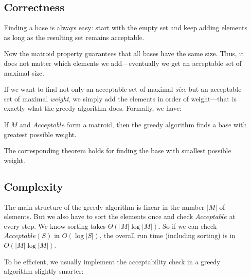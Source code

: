 \subsection{Correctness}

Finding a base is always easy: start with the empty set and keep adding elements as long as the resulting set remains acceptable.

Now the matroid property guarantees that all bases have the same size.
Thus, it does not matter which elements we add---eventually we get an acceptable set of maximal size.

If we want to find not only an acceptable set of maximal \emph{size} but an acceptable set of maximal \emph{weight}, we simply add the elements in order of weight---that is exactly what the greedy algorithm does.
Formally, we have:

\begin{theorem}
If $M$ and $Acceptable$ form a matroid, then the greedy algorithm finds a base with greatest possible weight.
\end{theorem}

The corresponding theorem holds for finding the base with smallest possible weight.

\subsection{Complexity}

The main structure of the greedy algorithm is linear in the number $|M|$ of elements.
But we also have to sort the elements once and check $Acceptable$ at every step.
We know sorting takes $\Theta(|M|\log |M|)$.
So if we can check $Acceptable(S)$ in $O(\log|S|)$, the overall run time (including sorting) is in $O(|M|\log|M|)$.

To be efficient, we usually implement the acceptability check in a greedy algorithm slightly smarter:
\begin{acode}
\\
\\
\\
\end{acode}

